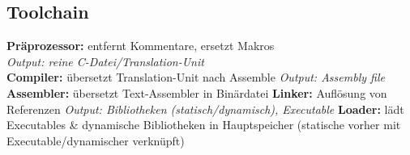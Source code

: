 \subsection{Toolchain}
\textbf{Präprozessor: }entfernt Kommentare, ersetzt Makros\\
\textit{Output: reine C-Datei/Translation-Unit}\\
\textbf{Compiler: }übersetzt Translation-Unit nach Assemble
\textit{Output: Assembly file}
\textbf{Assembler: }übersetzt Text-Assembler in Binärdatei
\textbf{Linker: }Auflösung von Referenzen
\textit{Output: Bibliotheken (statisch/dynamisch), Executable}
\textbf{Loader: }lädt Executables \& dynamische Bibliotheken in Hauptspeicher (statische vorher mit Executable/dynamischer verknüpft)




